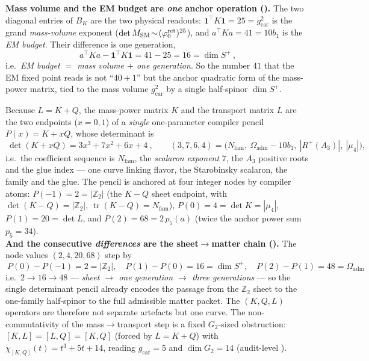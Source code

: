\documentclass[11pt,a4paper]{article}
\newcommand{\gcar}{g_{\mathrm{car}}}
\newcommand{\Nfam}{N_{\mathrm{fam}}}
\newcommand{\Oadm}{\Omega_{\mathrm{adm}}}
\newcommand{\phiz}{\varphi_0^{\mathrm{ret}}}
\newcommand{\Z}{\mathbb{Z}}
\theoremstyle{definition}
\begin{document}
\begin{winbox}
\noindent\textbf{Mass volume and the EM budget are \emph{one} anchor operation
().} The two diagonal entries of $B_K$ are the two physical readouts:
$\mathbf1^\top K\mathbf1=25=\gcar^2$ is the grand \emph{mass-volume} exponent ($\det M_{\rm SM}\!\sim\!(\phiz)^{25}$),
and $a^\top K a=41=10b_1$ is the \emph{EM budget}. Their difference is one generation,
\[
  \boxed{\ a^\top K a-\mathbf1^\top K\mathbf1=41-25=16=\dim S^+\ },
\]
i.e.\ \emph{EM budget $=$ mass volume $+$ one generation}. So the number $41$ that the EM fixed point reads is
not ``$40{+}1$'' but the anchor quadratic form of the mass-power matrix, tied to the mass volume $\gcar^2$ by
a single half-spinor $\dim S^+$.
\end{winbox}

\begin{winbox}
Because $L=K+Q$, the mass-power matrix $K$ and the transport matrix $L$ are the two endpoints
($x=0,1$) of a \emph{single} one-parameter compiler pencil $P(x)=K+xQ$, whose determinant is
\[
  \boxed{\ \det(K+xQ)=3x^3+7x^2+6x+4\ },\qquad
  (3,7,6,4)=\bigl(\Nfam,\ \Oadm-10b_1,\ |R^+(A_3)|,\ |\mu_4|\bigr),
\]
i.e.\ the coefficient sequence is $N_{\mathrm{fam}}$, the \emph{scalaron exponent} $7$, the $A_3$ positive
roots and the glue index --- one curve linking flavor, the Starobinsky scalaron, the family and the glue.
The pencil is anchored at four integer nodes by compiler atoms:
$P(-1)=2=|\Z_2|$ (the $K{-}Q$ sheet endpoint, with $\det(K{-}Q)=|\Z_2|$, $\operatorname{tr}(K{-}Q)=\Nfam$),
$P(0)=4=\det K=|\mu_4|$, $P(1)=20=\det L$, and $P(2)=68=2\,p_5(a)$ (twice the anchor power sum $p_5=34$).
\smallskip\\
\noindent\textbf{And the consecutive \emph{differences} are the sheet$\to$matter chain
().} The node values $(2,4,20,68)$ step by
\[
  \boxed{\ P(0){-}P(-1)=2=|\Z_2|,\quad P(1){-}P(0)=16=\dim S^+,\quad P(2){-}P(1)=48=\Oadm\ }
\]
i.e.\ $2\to16\to48$ --- \emph{sheet $\to$ one generation $\to$ three generations} --- so the single
determinant pencil already encodes the passage from the $\Z_2$ sheet to the one-family half-spinor to the
full admissible matter packet. The $(K,Q,L)$ operators are therefore not separate artefacts but one curve.
The non-commutativity of the mass$\to$transport step is a fixed $G_2$-sized obstruction:
$[K,L]=[L,Q]=[K,Q]$ (forced by $L=K+Q$) with $\chi_{[K,Q]}(t)=t^3+5t+14$, reading $\gcar=5$ and
$\dim G_2=14$ (audit-level \mO). 
\end{winbox}
\end{document}
